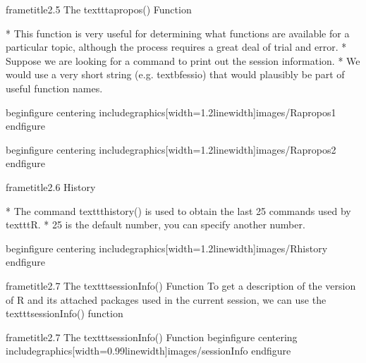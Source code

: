  		frametitle{2.5 The texttt{apropos()} Function}
 		
 		         * This function is very useful for determining what functions are available for a particular topic,
 		although the process requires a great deal of trial and error. 
 		         * Suppose we are looking for a
 		command to print out the session information. 
 		         * We would use a very short string (e.g. textbf{essio})
 		that would plausibly be part of useful function names.
 		
 	
 	
 		
 			begin{figure}
 				centering
 				includegraphics[width=1.2linewidth]{images/Rapropos1}       
 			end{figure}
 		   
 		
 			begin{figure}
 				centering
 				includegraphics[width=1.2linewidth]{images/Rapropos2}       
 			end{figure}
 		   
 	
 		frametitle{2.6 History}
 		
 			         * The command texttt{history()} is used to obtain the last 25 commands used by texttt{R}.
 			         * 25 is the default number, you can specify another number.
 		
 		
 		
 	
 	
 		begin{figure}
 			centering
 			includegraphics[width=1.2linewidth]{images/Rhistory}        
 		end{figure}
 	   
 	
 		frametitle{2.7 The texttt{sessionInfo()} Function}
 		To get a description of the version of R and its attached packages used in the current session,
 		we can use the texttt{sessionInfo()} function
 		
 	
 	
 	
 		
 		frametitle{2.7 The texttt{sessionInfo()} Function}
 		begin{figure}
 			centering
 			includegraphics[width=0.99linewidth]{images/sessionInfo}
 		end{figure}
 		
